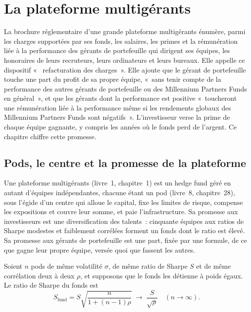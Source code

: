\chapter{La plateforme multigérants}\label{ch:fm:the-multi-manager-platform}

La brochure réglementaire d'une grande plateforme multigérants énumère, parmi les charges supportées par ses fonds, les salaires, les primes et la
rémunération liée à la performance des gérants de portefeuille qui dirigent ses équipes, les honoraires de leurs recruteurs, leurs ordinateurs et leurs bureaux. Elle appelle ce dispositif «~
refacturation des charges~». Elle ajoute que le gérant de portefeuille touche une part du profit de sa propre équipe, «~sans tenir compte de la
performance des autres gérants de portefeuille ou des Millennium Partners Funds en général~», et que les gérants dont la performance est positive
«~toucheront une rémunération liée à la performance même si les rendements globaux des Millennium Partners Funds sont négatifs~». L'investisseur verse la
prime de chaque équipe gagnante, y compris les années où le fonds perd de l'argent. Ce chapitre chiffre cette promesse.

\section{Pods, le centre et la promesse de la plateforme}

Une plateforme multigérants (livre~1, chapitre~1) est un hedge fund géré en autant d'équipes indépendantes, chacune étant un pod (livre~8, chapitre~28),
sous l'égide d'un centre qui alloue le capital, fixe les limites de risque, compense les expositions et couvre leur somme, et paie l'infrastructure. Sa promesse aux investisseurs est
une diversification des talents~: cinquante équipes aux ratios de Sharpe modestes et faiblement corrélées forment un fonds dont le ratio est élevé. Sa promesse aux gérants de portefeuille
est une part, fixée par une formule, de ce que gagne leur propre équipe, versée quoi que fassent les autres.

\begin{proposition}\label{prop:fm:the-multi-manager-platform:div}
Soient $n$ pods de même volatilité $\sigma$, de même ratio de Sharpe $S$ et de même corrélation deux à deux $\rho$, et supposons que le fonds les détienne à poids égaux.
Le ratio de Sharpe du fonds est
\[
S_{\mathrm{fund}}=S\sqrt{\frac{n}{1+(n-1)\rho}}\;\longrightarrow\;\frac{S}{\sqrt\rho}\quad(n\to\infty).
\]
\end{proposition}

